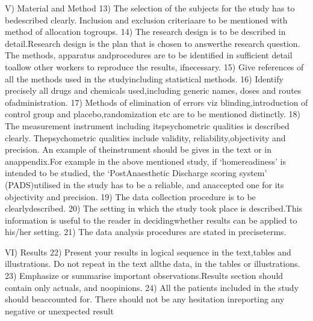 \documentclass{article}
\begin{document}
	
	V) Material and Method
	13) The selection of the subjects for the study has to bedescribed clearly. Inclusion and exclusion criteriaare to be mentioned with method of allocation togroups.
	14) The research design is to be described in detail.Research design is the plan that is chosen to answerthe research question.  The methods, apparatus  andprocedures are to be identified  in sufficient detail toallow other workers to reproduce the results, ifnecessary.
	15) Give references of  all the methods used in the studyincluding statistical methods.
	16) Identify precisely all drugs and chemicals used,including generic names, doses and routes ofadministration.
	17) Methods of elimination of errors viz blinding,introduction of control group and placebo,randomization etc are to be mentioned distinctly.
	18) The measurement instrument including itspsychometric qualities is described clearly.  Thepsychometric qualities include validity, reliability,objectivity  and precision.  An example of theinstrument should be gives in the text or in anappendix.For example in the above mentioned study, if ‘homereadiness’ is intended to be studied, the ‘PostAnaesthetic Discharge scoring system’ (PADS)utilised in the study has to be a reliable, and anaccepted one for its objectivity and precision.
	19) The data collection procedure is to be clearlydescribed.
	20) The setting in which the study took place is described.This information is useful to the reader in decidingwhether results can be applied to his/her setting.
	21) The data analysis procedures are stated in preciseterms.
	
	VI) Results
	22) Present your results in logical sequence  in the text,tables and illustrations.  Do not repeat in the text allthe data, in the tables or illustrations.
	23) Emphasize or summarise important observations.Results  section should contain only  actuals, and noopinions.
	24) All the patients included in the study should beaccounted for. There should not be any hesitation inreporting any negative or unexpected result
	
\end{document}
